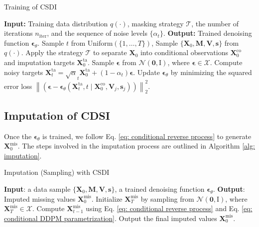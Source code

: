 \documentclass[11pt]{article}
\begin{document}
\begin{algorithm}
\caption{Training of CSDI}\label{alg: training}
\begin{algorithmic}[1] %
\State \textbf{Input:} Training data distribution $q(\cdot)$, masking strategy $\mathcal{T}$, the number of iterations $n_{\mathrm{iter}}$, and the sequence of noise levels $\{\alpha_t\}$.
\State \textbf{Output:} Trained denoising function $\bm{\epsilon}_{\theta}$.
    \State Sample $t$ from Uniform$(\{1,\ldots, T\})$, Sample $\{\bm{X}_0, \bm{M}, \bm{V}, \bm{s}\}$ from $q(\cdot)$.
    \State Apply the strategy $\mathcal{T}$ to separate $\bm{X}_0$ into conditional  observations $\bm{X}_0^{\mathrm{co}}$ and imputation targets $\bm{X}_0^{\mathrm{ta}}$.
    \State Sample $\bm{\epsilon}$ from $\mathcal{N}(\bm{0}, \mathrm{I})$, where $\bm{\epsilon}\in \mathcal{X}$.
    \State Compute noisy targets $\bm{X}_t^{\mathrm{ta}}=\sqrt{\alpha}_t \bm{X}_0^{\mathrm{ta}} + (1-\alpha_t)\bm{\epsilon}$.
    \State Update $\bm{\epsilon}_{\theta}$ by minimizing the squared error loss $\left\|\left(\boldsymbol{\epsilon}-\boldsymbol{\epsilon}_\theta\left(\mathbf{X}_t^{\mathrm{ta}}, t \mid \bm{X}_0^{\mathrm{co}},\bm{V}_j,\bm{s}_j\right)\right)\right\|_2^2$.
\EndFor
\end{algorithmic}
\end{algorithm}








\subsection{Imputation of CDSI}
Once the $\bm{\epsilon}_{\theta}$ is trained, we follow Eq. \ref{eq: conditional reverse process} to generate $\bm{X}_0^{\mathrm{mis}}$. The steps involved in the imputation process are outlined in Algorithm \ref{alg: imputation}.

\begin{algorithm}
\caption{Imputation (Sampling) with CSDI}\label{alg: imputation}
\begin{algorithmic}[1] 
\State \textbf{Input}: a data sample $\{\bm{X}_0,\bm{M},\bm{V}, \bm{s}\}$, a trained denoising function $\bm{\epsilon}_{\theta}$.
\State \textbf{Output}: Imputed missing values $\bm{X}_0^{\mathrm{mis}}$.
\State Initialize $\bm{X}_T^{\mathrm{mis}}$ by sampling from  $\mathcal{N}(\bm{0}, \bm{\mathrm{I}})$, where $\bm{X}_T^{\mathrm{mis}}\in \mathcal{X}$.
     \State Compute $\bm{X}_{t-1}^{\mathrm{mis}}$ using Eq. \ref{eq: conditional reverse process} and Eq. \ref{eq: conditional DDPM parametrization}.
\EndFor
\State Output the final imputed values
 $\bm{X}_0^{\mathrm{mis}}$.
\end{algorithmic}
\end{algorithm}
\end{document}
